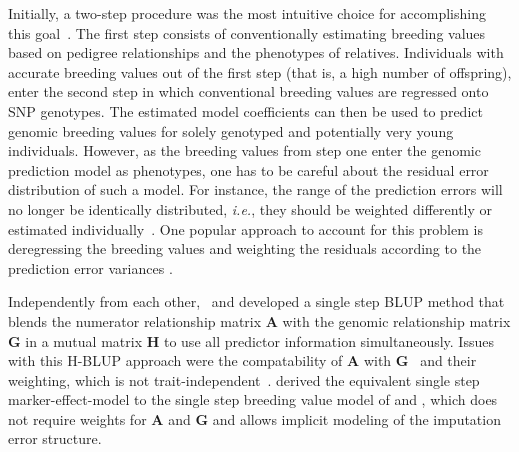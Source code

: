 \documentclass[12pt,titlepage]{article}
\begin{document}
Initially, a two-step procedure was the most intuitive choice for accomplishing
this goal~\cite{VanRaden2009}.
The first step consists of conventionally estimating breeding values based on
pedigree relationships and the phenotypes of relatives.
Individuals with accurate breeding values out of the first step (that is, a
high number of offspring), enter the second step in which conventional breeding
values are regressed onto SNP genotypes.
The estimated model coefficients can then be used to predict genomic breeding 
values for solely genotyped and potentially very young individuals.
However, as the breeding values from step one enter the genomic prediction
model as phenotypes, one has to be careful about the residual error
distribution of such a model.
For instance, the range of the prediction errors will no longer be identically
distributed, \textit{i.e.}, they should be weighted differently or estimated 
individually~\cite{Aguilar2010}.
One popular approach to account for this problem is deregressing the breeding
values and weighting the residuals according to the prediction error variances
\cite{Garrick2009}.

Independently from each other,~ and
 developed a single step BLUP method that blends the 
numerator relationship matrix $\mathbf{A}$ with the genomic relationship matrix
$\mathbf{G}$ in a mutual matrix $\mathbf{H}$ to use all predictor information
simultaneously.
Issues with this H-BLUP approach were the compatability of $\mathbf{A}$ with
$\mathbf{G}$~\cite{Christensen2012} and their weighting, which is not
trait-independent~\cite{Vitezica2011,Ashraf2016}.
 derived the equivalent single step marker-effect-model to 
the single step breeding value model of  and 
, which does not require weights for $\mathbf{A}$ and 
$\mathbf{G}$ and allows implicit modeling of the imputation error structure.
\end{document}
